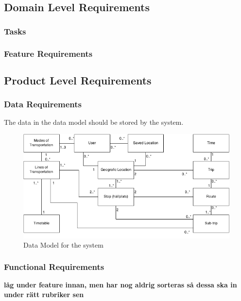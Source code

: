 \documentclass[a4paper]{article}
\begin{document}
		\subsection{Domain Level Requirements}
			\subsubsection{Tasks}
				
			\subsubsection{Feature Requirements}
								
			
		\subsection{Product Level Requirements}		
			\subsubsection{Data Requirements}
				The data in the data model should be stored by the system.	
				\begin{figure}[h]
					\includegraphics[scale=0.50]{datamodel-v1.png}
					\caption{Data Model for the system}
				\end{figure}
				
				
				
			\subsubsection{Functional Requirements}

		
				\textbf{låg under feature innan, men har nog aldrig sorteras så dessa ska in under rätt rubriker sen}
			
\end{document}
